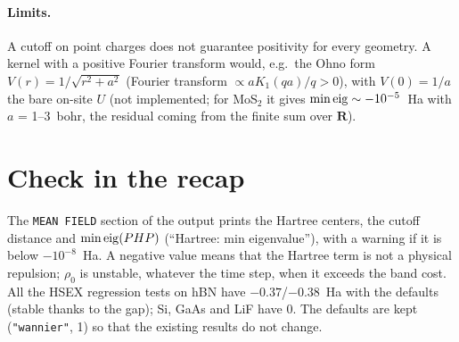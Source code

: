 \documentclass[11pt]{article}
\begin{document}
\paragraph{Limits.} A cutoff on point charges does not guarantee positivity for every geometry. A kernel with a
positive Fourier transform would, e.g.\ the Ohno form $V(r) = 1/\sqrt{r^2+a^2}$ (Fourier transform
$\propto a K_1(qa)/q > 0$), with $V(0)=1/a$ the bare on-site $U$ (not implemented; for MoS$_2$ it gives
$\min{\rm eig}\sim-10^{-5}$~Ha with $a$ = 1--3~bohr, the residual coming from the finite sum over $\mathbf R$).

\section{Check in the recap}

The \texttt{MEAN FIELD} section of the output prints the Hartree centers, the cutoff distance and
$\min{\rm eig}(PHP)$ (``Hartree: min eigenvalue''), with a warning if it is below $-10^{-8}$~Ha. A negative value
means that the Hartree term is not a physical repulsion; $\rho_0$ is unstable, whatever the time step, when it
exceeds the band cost. All the HSEX regression tests on hBN have $-0.37$/$-0.38$~Ha with the defaults (stable thanks
to the gap); Si, GaAs and LiF have 0. The defaults are kept
(\texttt{"wannier"}, 1) so that the existing results do not change.
\end{document}
